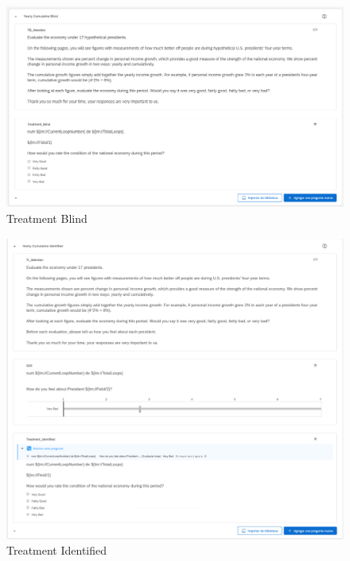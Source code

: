 \documentclass[
]{article}
\begin{document}
\begin{figure}
\hypertarget{fig:label}{%
\centering
\includegraphics[width=1\textwidth,height=1\textheight]{treat_blind.png}
\caption{Treatment Blind}\label{fig:label}
}
\end{figure}

\begin{figure}
\hypertarget{fig:label}{%
\centering
\includegraphics[width=1\textwidth,height=1\textheight]{treat_identified.png}
\caption{Treatment Identified}\label{fig:label}
}
\end{figure}
\end{document}
